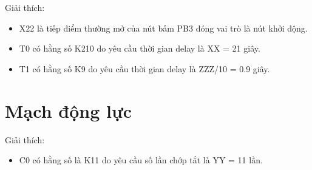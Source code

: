 \documentclass[12pt,a4paper]{article}
\begin{document}
Giải thích:
\begin{itemize}
    \item X22 là tiếp điểm thường mở của nút bấm PB3 đóng vai trò là nút khởi động.
    \item T0 có hằng số K210 do yêu cầu thời gian delay là XX = 21 giây.
    \item T1 có hằng số K9 do yêu cầu thời gian delay là ZZZ/10 = 0.9 giây.
\end{itemize}
\newpage
\section{Mạch động lực}

\begin{figure}[ht]
    \centering
\end{figure}

Giải thích:
\begin{itemize}
    \item C0 có hằng số là K11 do yêu cầu số lần chớp tắt là YY = 11 lần.
\end{itemize}
\end{document}
